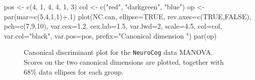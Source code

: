 \documentclass[
  letterpaper,
  10pt,
  krantz2]{krantz}
\makeatletter
\newenvironment{Shaded}{\begin{snugshade}}{\end{snugshade}}
\newcommand{\AttributeTok}[1]{\textcolor[rgb]{0.40,0.45,0.13}{#1}}
\newcommand{\ConstantTok}[1]{\textcolor[rgb]{0.56,0.35,0.01}{#1}}
\newcommand{\DecValTok}[1]{\textcolor[rgb]{0.68,0.00,0.00}{#1}}
\newcommand{\FloatTok}[1]{\textcolor[rgb]{0.68,0.00,0.00}{#1}}
\newcommand{\FunctionTok}[1]{\textcolor[rgb]{0.28,0.35,0.67}{#1}}
\newcommand{\NormalTok}[1]{\textcolor[rgb]{0.00,0.23,0.31}{#1}}
\newcommand{\OtherTok}[1]{\textcolor[rgb]{0.00,0.23,0.31}{#1}}
\newcommand{\SpecialCharTok}[1]{\textcolor[rgb]{0.37,0.37,0.37}{#1}}
\newcommand{\StringTok}[1]{\textcolor[rgb]{0.13,0.47,0.30}{#1}}
\newenvironment{kframe}{%
  \medskip{}
  \setlength{\fboxsep}{.8em}
  \def\at@end@of@kframe{}%
  \ifinner\ifhmode%
  \def\at@end@of@kframe{\end{minipage}}%
  \begin{minipage}{\columnwidth}%
  \fi\fi%
  \def\FrameCommand##1{\hskip\@totalleftmargin \hskip-\fboxsep
  \colorbox{shadecolor}{##1}\hskip-\fboxsep
      \hskip-\linewidth \hskip-\@totalleftmargin \hskip\columnwidth}%
  \MakeFramed {\advance\hsize-\width
    \@totalleftmargin\z@ \linewidth\hsize
    \@setminipage}}%
{\par\unskip\endMakeFramed%
  \at@end@of@kframe}
\renewenvironment{Shaded}{\begin{kframe}}{\end{kframe}}
\makeatother
\begin{document}
\begin{Shaded}
\begin{Highlighting}[]
\NormalTok{pos }\OtherTok{\textless{}{-}} \FunctionTok{c}\NormalTok{(}\DecValTok{4}\NormalTok{, }\DecValTok{1}\NormalTok{, }\DecValTok{4}\NormalTok{, }\DecValTok{4}\NormalTok{, }\DecValTok{1}\NormalTok{, }\DecValTok{3}\NormalTok{)}
\NormalTok{col }\OtherTok{\textless{}{-}} \FunctionTok{c}\NormalTok{(}\StringTok{"red"}\NormalTok{, }\StringTok{"darkgreen"}\NormalTok{, }\StringTok{"blue"}\NormalTok{)}
\NormalTok{op }\OtherTok{\textless{}{-}} \FunctionTok{par}\NormalTok{(}\AttributeTok{mar=}\FunctionTok{c}\NormalTok{(}\DecValTok{5}\NormalTok{,}\DecValTok{4}\NormalTok{,}\DecValTok{1}\NormalTok{,}\DecValTok{1}\NormalTok{)}\SpecialCharTok{+}\NormalTok{.}\DecValTok{1}\NormalTok{)}
\FunctionTok{plot}\NormalTok{(NC.can, }
     \AttributeTok{ellipse=}\ConstantTok{TRUE}\NormalTok{, }
     \AttributeTok{rev.axes=}\FunctionTok{c}\NormalTok{(}\ConstantTok{TRUE}\NormalTok{,}\ConstantTok{FALSE}\NormalTok{), }
     \AttributeTok{pch=}\FunctionTok{c}\NormalTok{(}\DecValTok{7}\NormalTok{,}\DecValTok{9}\NormalTok{,}\DecValTok{10}\NormalTok{),}
     \AttributeTok{var.cex=}\FloatTok{1.2}\NormalTok{, }\AttributeTok{cex.lab=}\FloatTok{1.5}\NormalTok{, }\AttributeTok{var.lwd=}\DecValTok{2}\NormalTok{,  }\AttributeTok{scale=}\FloatTok{4.5}\NormalTok{, }
     \AttributeTok{col=}\NormalTok{col,}
       \AttributeTok{var.col=}\StringTok{"black"}\NormalTok{, }\AttributeTok{var.pos=}\NormalTok{pos,}
     \AttributeTok{prefix=}\StringTok{"Canonical dimension "}\NormalTok{)}
\FunctionTok{par}\NormalTok{(op)}
\end{Highlighting}
\end{Shaded}

\begin{figure}[H]


\caption{\label{fig-NC-candisc}Canonical discriminant plot for the
\texttt{NeuroCog} data MANOVA. Scores on the two canonical dimensions
are plotted, together with 68\% data ellipses for each group.}

\end{figure}%
\end{document}
